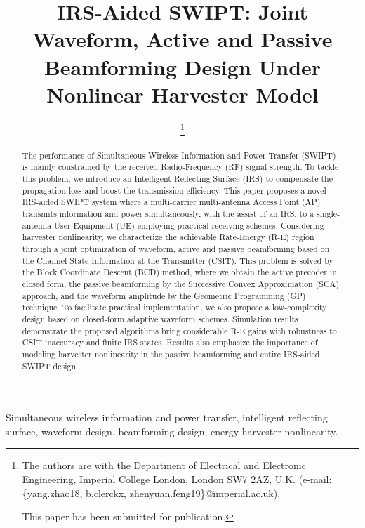 \documentclass[journal]{IEEEtran}
\begin{document}
	\title{IRS-Aided SWIPT: Joint Waveform, Active and Passive Beamforming Design Under Nonlinear Harvester Model}
	\author{
		\thanks{
			The authors are with the Department of Electrical and Electronic Engineering, Imperial College London, London SW7 2AZ, U.K. (e-mail: \{yang.zhao18, b.clerckx, zhenyuan.feng19\}@imperial.ac.uk).

			This paper has been submitted for publication.
		}
	}
	\maketitle


	\begin{abstract}
		The performance of Simultaneous Wireless Information and Power Transfer (SWIPT) is mainly constrained by the received Radio-Frequency (RF) signal strength. To tackle this problem, we introduce an Intelligent Reflecting Surface (IRS) to compensate the propagation loss and boost the transmission efficiency. This paper proposes a novel IRS-aided SWIPT system where a multi-carrier multi-antenna Access Point (AP) transmits information and power simultaneously, with the assist of an IRS, to a single-antenna User Equipment (UE) employing practical receiving schemes. Considering harvester nonlinearity, we characterize the achievable Rate-Energy (R-E) region through a joint optimization of waveform, active and passive beamforming based on the Channel State Information at the Transmitter (CSIT). This problem is solved by the Block Coordinate Descent (BCD) method, where we obtain the active precoder in closed form, the passive beamforming by the Successive Convex Approximation (SCA) approach, and the waveform amplitude by the Geometric Programming (GP) technique. To facilitate practical implementation, we also propose a low-complexity design based on closed-form adaptive waveform schemes. Simulation results demonstrate the proposed algorithms bring considerable R-E gains with robustness to CSIT inaccuracy and finite IRS states. Results also emphasize the importance of modeling harvester nonlinearity in the passive beamforming and entire IRS-aided SWIPT design.
	\end{abstract}


	\begin{IEEEkeywords}
		Simultaneous wireless information and power transfer, intelligent reflecting surface, waveform design, beamforming design, energy harvester nonlinearity.
	\end{IEEEkeywords}
\end{document}
